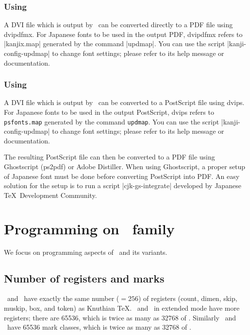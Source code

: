 \documentclass[a4paper,11pt,dvipdfmx]{article}
\let\emph=\origemph
\def\code#1{\texttt{#1}}
\begin{document}
\subsubsection{Using \emph{dvipdfmx}}

A DVI file which is output by \pTeX\ can be converted directly to a PDF file
using dvipdfmx.
For Japanese fonts to be used in the output PDF, dvipdfmx refers to
|kanjix.map| generated by the command |updmap|.
You can use the script |kanji-config-updmap| to change font settings;
please refer to its help message or documentation.

\subsubsection{Using \emph{dvips}}

A DVI file which is output by \pTeX\ can be converted to a PostScript file
using dvips.
For Japanese fonts to be used in the output PostScript, dvips refers to
\code{psfonts.map} generated by the command \code{updmap}.
You can use the script |kanji-config-updmap| to change font settings;
please refer to its help message or documentation.

The resulting PostScript file can then be converted to
a PDF file using Ghostscript (ps2pdf) or Adobe Distiller.
When using Ghostscript, a proper setup of Japanese font must be done
before converting PostScript into PDF.
An easy solution for the setup is to run a script |cjk-gs-integrate|
developed by Japanese \TeX\ Development Community.

\section{Programming on \pTeX\ family}

We focus on programming aspects of \pTeX\ and its variants.

\subsection{Number of registers and marks}

\pTeX\ and \upTeX\ have exactly the same number ($=256$) of registers
(count, dimen, skip, muskip, box, and token) as Knuthian \TeX.
\epTeX\ and \eupTeX\ in extended mode have more registers;
there are 65536, which is twice as many as 32768 of \eTeX.
Similarly \epTeX\ and \eupTeX\ have 65536 mark classes,
which is twice as many as 32768 of \eTeX.
\end{document}
